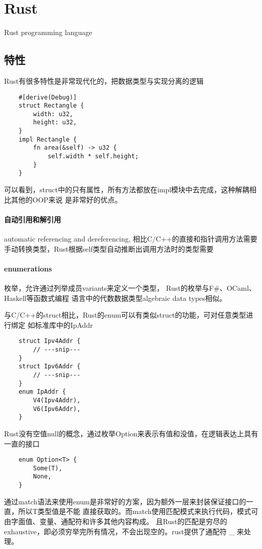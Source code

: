 \chapter{Rust}

Rust programming language

\section{特性}

Rust有很多特性是非常现代化的，把数据类型与实现分离的逻辑
\begin{lstlisting}
    #[derive(Debug)]
    struct Rectangle {
        width: u32,
        height: u32,
    }
    impl Rectangle {
        fn area(&self) -> u32 {
            self.width * self.height;
        }
    }
\end{lstlisting}
可以看到，struct中的只有属性，所有方法都放在impl模块中去完成，这种解耦相比其他的OOP来说
是非常好的优点。

\subsubsection{自动引用和解引用}
automatic referencing and dereferencing, 
相比C/C++的直接和指针调用方法需要手动转换类型，Rust根据self类型自动推断出调用方法时的类型需要

\subsubsection{enumerations}

枚举，允许通过列举成员variants来定义一个类型， Rust的枚举与F\#、OCaml、Haskell等函数式编程
语言中的代数数据类型algebraic data types相似。

与C/C++的struct相比，Rust的enum可以有类似struct的功能，可对任意类型进行绑定
如标准库中的IpAddr
\begin{lstlisting}
    struct Ipv4Addr {
        // ---snip---
    }
    struct Ipv6Addr {
        // ---snip---
    }
    enum IpAddr {
        V4(Ipv4Addr),
        V6(Ipv6Addr),
    }
\end{lstlisting}

Rust没有空值null的概念，通过枚举Option来表示有值和没值，在逻辑表达上具有一直的接口
\begin{lstlisting}
    enum Option<T> {
        Some(T),
        None,
    }
\end{lstlisting}
通过match语法来使用enum是非常好的方案，因为额外一层来封装保证接口的一直，所以T类型值是不能
直接获取的。而match使用匹配模式来执行代码，模式可由字面值、变量、通配符和许多其他内容构成。
且Rust的匹配是穷尽的exhaustive，即必须穷举完所有情况，不会出现空的。rust提供了通配符 \_ 来处理。



